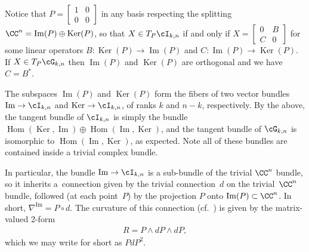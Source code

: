 Notice that $P =\left[\begin{smallmatrix}
1 & 0 \\
0 & 0
\end{smallmatrix}\right]$ in any basis respecting the splitting $\CC^n = \operatorname{Im}(P) \oplus \operatorname{Ker}(P)$, so that $X \in T_P \cI_{k,n}$ if and only if
$X =\left[\begin{smallmatrix}
0 & B \\
C & 0
\end{smallmatrix}\right]$ for some linear operators $B\colon \operatorname{Ker}(P) \to \operatorname{Im}(P)$ and $C \colon \operatorname{Im}(P) \to \operatorname{Ker}(P)$. If $X \in T_P \cG_{k,n}$ then $\operatorname{Im}(P)$ and $\operatorname{Ker}(P)$ are orthogonal and we have $C = B^*$.

The subspaces $\operatorname{Im}(P)$ and $\operatorname{Ker}(P)$ form the fibers of two vector bundles $\operatorname{Im} \to \cI_{k,n}$ and
$\operatorname{Ker} \to \cI_{k,n}$, of ranks $k$ and $n-k$, respectively. By the above, the tangent bundle of $\cI_{k,n}$ is simply the bundle $\operatorname{Hom}( \operatorname{Ker}, \operatorname{Im}) \oplus \operatorname{Hom}( \operatorname{Im}, \operatorname{Ker})$, and the tangent bundle of $\cG_{k,n}$ is isomorphic to $\operatorname{Hom}(\operatorname{Im},\operatorname{Ker})$, as expected. Note all of these bundles are contained inside a trivial complex bundle.

In particular, the bundle $\operatorname{Im} \to \cI_{k,n}$ is a sub-bundle of the trivial $\CC^n$ bundle, so it inherits a~connection given by
the trivial connection~$d$ on the trivial~$\CC^n$ bundle, followed (at each point~$P$) by the projection $P$ onto $\operatorname{Im}(P) \subset \CC^n$. In short, $\nabla^{\operatorname{Im}} = P \circ d$. The curvature of this connection (cf.~\cite[p.~344]{K}) is given by the matrix-valued 2-form
\begin{gather*}
R = P \wedge dP \wedge dP,
\end{gather*}
which we may write for short as $PdP^2$.

